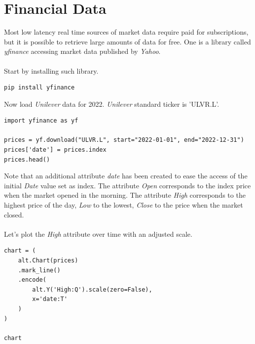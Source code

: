\documentclass[11pt]{article}
\begin{document}
\section{Financial Data}

Most low latency real time sources of market data require paid for subscriptions, but it is possible to retrieve large amounts of data for free. One is a library called \textit{yfinance} accessing market data published by \textit{Yahoo}.\\
\\
Start by installing such library.

\begin{verbatim}
pip install yfinance
\end{verbatim}

Now load \textit{Unilever} data for 2022. \textit{Unilever} standard ticker is 'ULVR.L'.

\begin{verbatim}
import yfinance as yf

prices = yf.download("ULVR.L", start="2022-01-01", end="2022-12-31")
prices['date'] = prices.index
prices.head()
\end{verbatim}

Note that an additional attribute \textit{date} has been created to ease the access of the initial \textit{Date} value set as index. The attribute \textit{Open} corresponds to the index price when the market opened in the morning. The attribute \textit{High} corresponds to the highest price of the day, \textit{Low} to the lowest, \textit{Close} to the price when the market closed.\\
\\
Let's plot the \textit{High} attribute over time with an adjusted scale.

\begin{verbatim}
chart = (
    alt.Chart(prices)
    .mark_line()
    .encode(
        alt.Y('High:Q').scale(zero=False),
        x='date:T'
    )
)

chart
\end{verbatim}
\end{document}
